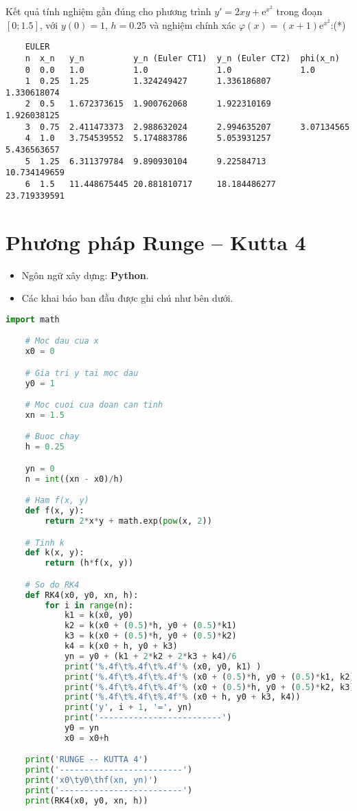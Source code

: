 Kết quả tính nghiệm gần đúng cho phương trình $y'=2xy+\mathrm{e}^{x^2}$ trong đoạn $[0;1.5]$, với $y(0)=1$, $h=0.25$ và nghiệm chính xác $\varphi(x)=(x+1)\mathrm{e}^{x^2}$:\hfill(*)
\begin{lstlisting}
	EULER
	n  x_n   y_n          y_n (Euler CT1)  y_n (Euler CT2)  phi(x_n)
	0  0.0   1.0          1.0              1.0              1.0
	1  0.25  1.25         1.324249427      1.336186807      1.330618074
	2  0.5   1.672373615  1.900762068      1.922310169      1.926038125
	3  0.75  2.411473373  2.988632024      2.994635207      3.07134565
	4  1.0   3.754539552  5.174883786      5.053931257      5.436563657
	5  1.25  6.311379784  9.890930104      9.22584713       10.734149659
	6  1.5   11.448675445 20.881810717     18.184486277     23.719339591
\end{lstlisting}

\section{Phương pháp Runge – Kutta 4}
\begin{itemize}
	\item Ngôn ngữ xây dựng: \textbf{Python}.
	\item Các khai báo ban đầu được ghi chú như bên dưới.
\end{itemize}
\begin{lstlisting}[language=Python]
	import math

	# Moc dau cua x
	x0 = 0

	# Gia tri y tai moc dau
	y0 = 1

	# Moc cuoi cua doan can tinh
	xn = 1.5

	# Buoc chay
	h = 0.25

	yn = 0
	n = int((xn - x0)/h)

	# Ham f(x, y)
	def f(x, y):
		return 2*x*y + math.exp(pow(x, 2))

	# Tinh k
	def k(x, y):
		return (h*f(x, y))

	# So do RK4
	def RK4(x0, y0, xn, h):
	    for i in range(n):
	        k1 = k(x0, y0)
	        k2 = k(x0 + (0.5)*h, y0 + (0.5)*k1)
	        k3 = k(x0 + (0.5)*h, y0 + (0.5)*k2)
	        k4 = k(x0 + h, y0 + k3)
	        yn = y0 + (k1 + 2*k2 + 2*k3 + k4)/6
	        print('%.4f\t%.4f\t%.4f'% (x0, y0, k1) )
	        print('%.4f\t%.4f\t%.4f'% (x0 + (0.5)*h, y0 + (0.5)*k1, k2))
	        print('%.4f\t%.4f\t%.4f'% (x0 + (0.5)*h, y0 + (0.5)*k2, k3))
	        print('%.4f\t%.4f\t%.4f'% (x0 + h, y0 + k3, k4))
	        print('y', i + 1, '=', yn)
	        print('-------------------------')
	        y0 = yn
	        x0 = x0+h

	print('RUNGE -- KUTTA 4')
	print('-------------------------')    
	print('x0\ty0\thf(xn, yn)')
	print('-------------------------')
	print(RK4(x0, y0, xn, h))
\end{lstlisting}


